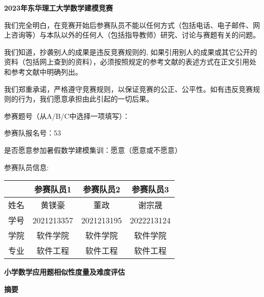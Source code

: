 \thispagestyle{empty}   %

\begin{center}
    \textbf{\fontsize{30}{1.5} 2023年东华理工大学数学建模竞赛}
\end{center}

我们完全明白，在竞赛开始后参赛队员不能以任何方式（包括电话、电子邮件、网上咨询等）与本队以外的任何人（包括指导教师）研究、讨论与赛题有关的问题。

我们知道，抄袭别人的成果是违反竞赛规则的, 如果引用别人的成果或其它公开的资料（包括网上查到的资料），必须按照规定的参考文献的表述方式在正文引用处和参考文献中明确列出。

我们郑重承诺，严格遵守竞赛规则，以保证竞赛的公正、公平性。如有违反竞赛规则的行为，我们愿意承担由此引起的一切后果。

参赛题号（从A/B/C中选择一项填写）：

参赛队报名号：53

是否愿意参加暑假数学建模集训：愿意（愿意或不愿意）\newline


{\fontsize{20}{2}参赛队员信息:}

\begin{table}[h]
    \centering
    \begin{tabular}{|c|c|c|c|}
    \hline
       & 参赛队员1      & 参赛队员2      & 参赛队员3      \\ \hline
    姓名 & 黄镁豪        & 董政         & 谢宗晟        \\ \hline
    学号 & 2021213357 & 2021213195 & 2022213124 \\ \hline
    学院 & 软件学院       & 软件学院       & 软件学院       \\ \hline
    专业 & 软件工程       & 软件工程       & 软件工程       \\ \hline
    \end{tabular}
\end{table}


\newpage

\begin{center}
    \textbf{\fontsize{20}{1.5}小学数学应用题相似性度量及难度评估}

    \textbf{摘要}
\end{center}
